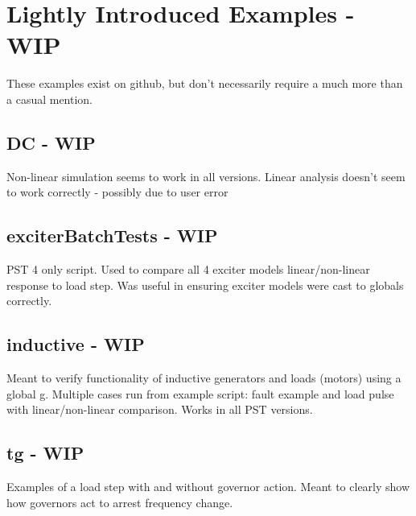 \pagebreak


\pagebreak


\pagebreak
\section{Lightly Introduced Examples - WIP}
These examples exist on github, but don't necessarily require a much more than a casual mention.
\subsection{DC - WIP}
Non-linear simulation seems to work in all versions.
Linear analysis doesn't seem to work correctly - possibly due to user error

\subsection{exciterBatchTests - WIP}
PST 4 only script.
Used to compare all 4 exciter models linear/non-linear response to load step.
Was useful in ensuring exciter models were cast to globals correctly.

\subsection{inductive - WIP}
Meant to verify functionality of inductive generators and loads (motors) using a global g.
Multiple cases run from example script: fault example and load pulse with linear/non-linear comparison.
Works in all PST versions.

\subsection{tg - WIP}
Examples of a load step with and without governor action.
Meant to clearly show how governors act to arrest frequency change.

